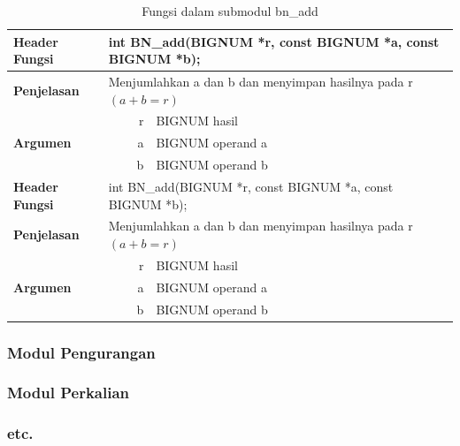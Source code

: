 \begin{table}[]
  \caption{Fungsi dalam submodul bn\_add}
\begin{tabular}{||l||r|l||}
\hline \hline
\textbf{Header Fungsi}            & \multicolumn{2}{l||}{int BN\_add(BIGNUM *r, const BIGNUM *a, const BIGNUM *b);} \\ \hline
\textbf{Penjelasan}               & \multicolumn{2}{l||}{Menjumlahkan a dan b dan menyimpan hasilnya pada r $(a+b=r)$}    \\ \hline
\multirow{3}{*}{\textbf{Argumen}} & r                              & BIGNUM hasil                                  \\
                                  & a                              & BIGNUM operand a                              \\
                                  & b                              & BIGNUM operand b                              \\ \hline \hline
\textbf{Header Fungsi}            & \multicolumn{2}{l||}{int BN\_add(BIGNUM *r, const BIGNUM *a, const BIGNUM *b);} \\ \hline
\textbf{Penjelasan}               & \multicolumn{2}{l||}{Menjumlahkan a dan b dan menyimpan hasilnya pada r $(a+b=r)$}    \\ \hline
\multirow{3}{*}{\textbf{Argumen}} & r                              & BIGNUM hasil                                  \\
                                  & a                              & BIGNUM operand a                              \\
                                  & b                              & BIGNUM operand b                              \\ \hline \hline
\end{tabular}
\end{table}

%
%
%
%



\subsubsection{Modul Pengurangan}
\subsubsection{Modul Perkalian}
\subsubsection{etc.}
